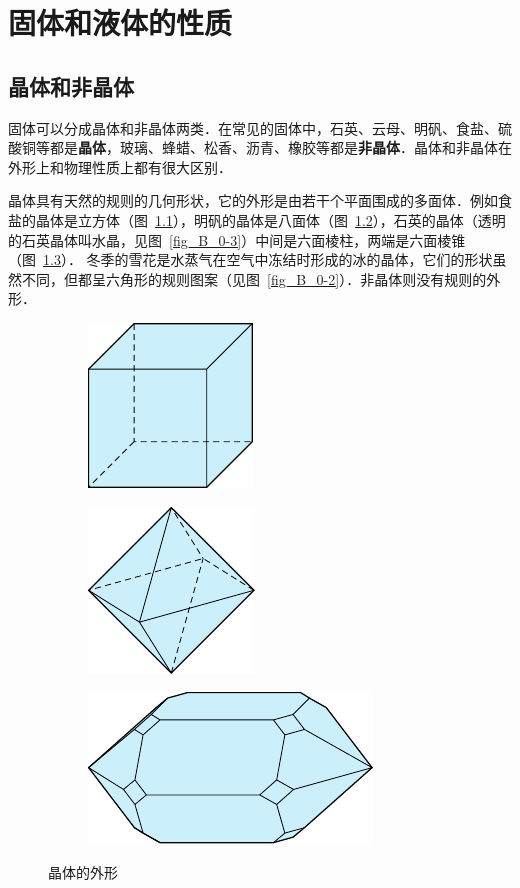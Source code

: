 \chapter{固体和液体的性质}\label{chapter-properties-of-solids-and-liquids}

\section{晶体和非晶体}
固体可以分成晶体和非晶体两类．在常见的固体中，石英、云母、明矾、食盐、硫酸铜等都是\textbf{晶体}，玻璃、蜂蜡、松香、沥青、橡胶等都是\textbf{非晶体}．晶体和非晶体在外形上和物理性质上都有很大区别．

晶体具有天然的规则的几何形状，它的外形是由若干个平面围成的多面体．例如食盐的晶体是立方体（图~\ref{fig_B_4-1a}），明矾的晶体是八面体（图~\ref{fig_B_4-1b}），石英的晶体（透明的石英晶体叫水晶，见图~\ref{fig_B_0-3}）中间是六面棱柱，两端是六面棱锥（图~\ref{fig_B_4-1c}）．
冬季的雪花是水蒸气在空气中冻结时形成的冰的晶体，它们的形状虽然不同，但都呈六角形的规则图案（见图~\ref{fig_B_0-2}）．非晶体则没有规则的外形．

\begin{figure}[htbp]
	\centering
	\begin{subfigure}{0.3\linewidth}
		\centering
		\includegraphics{fig/B/4-1a.pdf}
		\caption{}\label{fig_B_4-1a}
	\end{subfigure}
	\hfil
	\begin{subfigure}{0.3\linewidth}
		\centering
		\includegraphics{fig/B/4-1b.pdf}
		\caption{}\label{fig_B_4-1b}
	\end{subfigure}
	\hfil
	\begin{subfigure}{0.3\linewidth}
		\centering
		\includegraphics{fig/B/4-1c.pdf}
		\caption{}\label{fig_B_4-1c}
	\end{subfigure}
	\caption{晶体的外形}\label{fig_B_4-1}
\end{figure}


